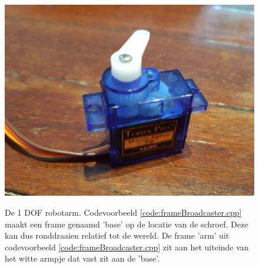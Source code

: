 \begin{figure}[ht]
\begin{center}
\includegraphics[scale=0.15]{Pictures/servo.jpg}\\
\end{center}
\caption{De 1 DOF robotarm. Codevoorbeeld \ref{code:frameBroadcaster.cpp} maakt een frame genaamd 'base' op de locatie van de schroef. Deze kan dus ronddraaien relatief tot de wereld. De frame 'arm' uit codevoorbeeld \ref{code:frameBroadcaster.cpp} zit aan het uiteinde van het witte armpje dat vast zit aan de 'base'.}
\label{fig:1DOFRobotarm}
\end{figure}

